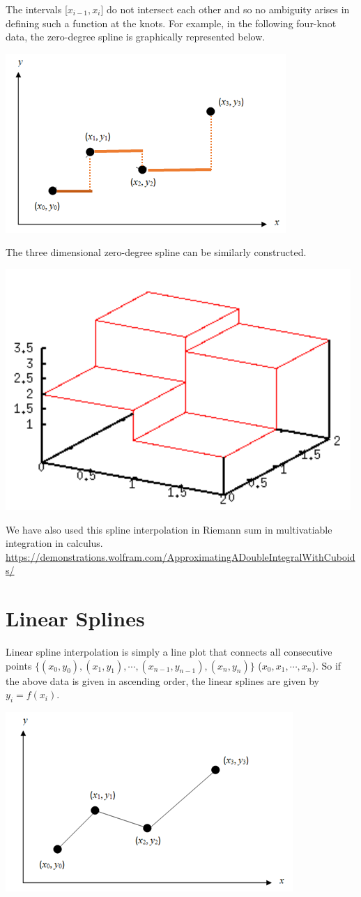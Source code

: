 \documentclass[
]{book}
\begin{document}
The intervals {[}\(x_{i-1}, x_i\){]} do not intersect each other and so no ambiguity arises in defining such a function at the knots. For example, in the following four-knot data, the zero-degree spline is graphically represented below.

\begin{center}\includegraphics[width=0.4\linewidth]{img10/01-zeroDegSplineCurve} \end{center}

\hfill\break

The three dimensional zero-degree spline can be similarly constructed.

\begin{center}\includegraphics[width=0.4\linewidth]{img10/w10-3DStepFunction} \end{center}

We have also used this spline interpolation in Riemann sum in multivatiable integration in calculus. \url{https://demonstrations.wolfram.com/ApproximatingADoubleIntegralWithCuboids/}

\hfill\break

\hfill\break

\hypertarget{linear-splines}{%
\section{Linear Splines}\label{linear-splines}}

Linear spline interpolation is simply a line plot that connects all consecutive points \(\{(x_0, y_0), (x_1, y_1), \cdots, (x_{n-1}, y_{n-1}),(x_{n}, y_{n})\}\) (\(x_0, x_1, \cdots, x_n\)). So if the above data is given in ascending order, the linear splines are given by \(y_i = f(x_i)\).

\begin{center}\includegraphics[width=0.35\linewidth]{img10/03-oneDegSplineCurve} \end{center}
\end{document}

